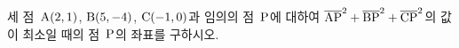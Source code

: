 세 점~$\mathrm{A}(2{,}\mkern3mu\mathopen{}1)$, $\mathrm{B}(5{,}\mkern3mu\mathopen{}-4)$, $\mathrm{C}(-1{,}\mkern3mu\mathopen{}0)$과 임의의 점~$\mathrm{P}$에 대하여 $\overline{\mathrm{AP}}^2+\overline{\mathrm{BP}}^2+\overline{\mathrm{CP}}^2$의 값이 최소일 때의 점~$\mathrm{P}$의 좌표를 구하시오.
